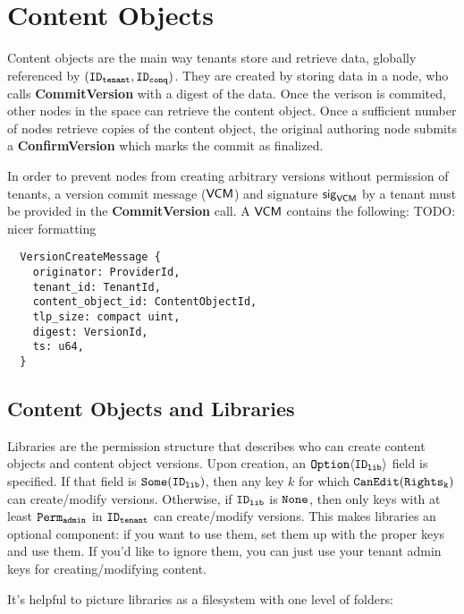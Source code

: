 \section{Content Objects}
Content objects are the main way tenants store and retrieve data, globally referenced by $(\mathtt{ID_{tenant}}, \mathtt{ID_{conq}})$.
They are created by storing data in a node, who calls \textbf{CommitVersion} with a digest of the data.
Once the verison is commited, other nodes in the space can retrieve the content object.
Once a sufficient number of nodes retrieve copies of the content object, %
the original authoring node submits a \textbf{ConfirmVersion} which marks the commit as finalized.

In order to prevent nodes from creating arbitrary versions without permission of tenants, a version commit message ($\mathsf{VCM}$) and signature $\mathsf{sig}_{\mathsf{VCM}}$ by a tenant must be provided in the \textbf{CommitVersion} call.
A $\mathsf{VCM}$ contains the following:
TODO: nicer formatting
\begin{verbatim}
  VersionCreateMessage {
    originator: ProviderId,
    tenant_id: TenantId,
    content_object_id: ContentObjectId,
    tlp_size: compact uint,
    digest: VersionId,
    ts: u64,
  }
\end{verbatim}

\subsection{Content Objects and Libraries}
Libraries are the permission structure that describes who can create content objects and content object versions.
Upon creation, an $\mathtt{Option\langle}\mathtt{ID_{lib}}\mathtt{\rangle}$ field is specified. 
If that field is $\mathtt{Some(}{\mathtt{ID_{lib}}}\mathtt{)}$, then any key $k$ for which $\mathtt{CanEdit}(\mathtt{Rights_{k}})$ can create/modify versions.
Otherwise, if $\mathtt{ID_{lib}}$ is $\mathtt{None}$, then only keys with at least $\mathtt{Perm_{admin}}$ in $\mathtt{ID_{tenant}}$ can create/modify versions.
This makes libraries an optional component: if you want to use them, set them up with the proper keys and use them.
If you'd like to ignore them, you can just use your tenant admin keys for creating/modifying content.

It's helpful to picture libraries as a filesystem with one level of folders:


